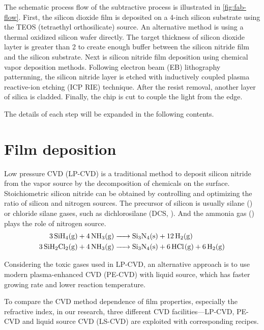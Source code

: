 The schematic process flow of the subtractive process is illustrated in \autoref{fig:fab-flow}. First, the silicon dioxide film is deposited on a 4-inch silicon substrate using the TEOS  (tetraethyl orthosilicate) source.
An alternative method is using a thermal oxidized silicon wafer directly. The target thickness of silicon dioxide layter is greater than 2 \um to create enough buffer between the silicon nitride film and the silicon substrate. 
Next is silicon nitride film deposition using chemical vapor deposition methods. Following electron beam (EB) lithography patternning, the silicon nitride layer is etched with inductively coupled plasma reactive-ion etching (ICP RIE) technique. After the resist removal, another layer of silica is cladded. Finally, the chip is cut to couple the light from the edge. 

The details of each step will be expanded in the following contents.

\section{Film deposition}

Low pressure CVD (LP-CVD) is a traditional method to deposit silicon nitride from the vapor source by the decomposition of chemicals on the surface.  
Stoichiometric silicon nitride can be obtained by controlling and optimizing the ratio of silicon and nitrogen sources. 
The precursor of silicon is usually silane () or chloride silane gases, such as dichlorosilane (DCS, ). And the ammonia gas () plays the role of nitrogen source. 
\begin{align*}
    \ce{3SiH4(g) + 4NH3(g) &-> Si3N4(s) + 12H2(g)} \\
    \ce{3SiH2Cl2(g) + 4NH3(g) &-> Si3N4(s) + 6HCl(g) + 6H2(g)}
\end{align*}

Considering the toxic gases used in LP-CVD, an alternative approach is to use modern plasma-enhanced CVD (PE-CVD) with liquid source, which has faster growing rate and lower reaction temperature. 


To compare the CVD method dependence of film properties, especially the refractive index, in our research, three different CVD facilities---LP-CVD, PE-CVD and liquid source CVD (LS-CVD) are exploited with corresponding recipes.

